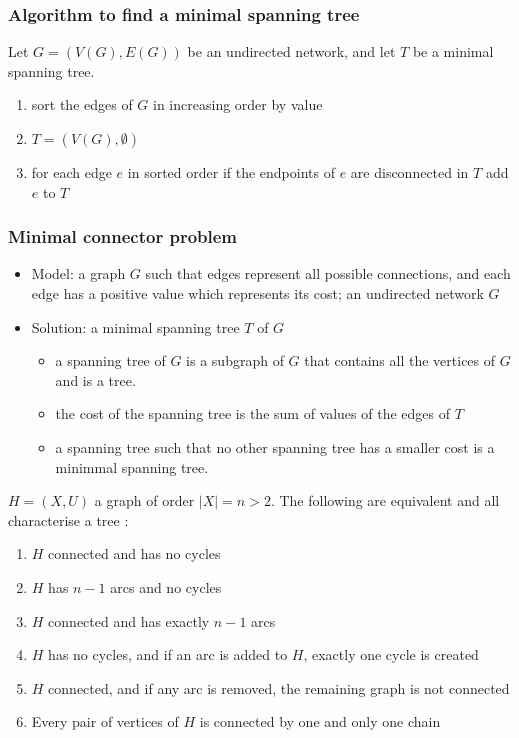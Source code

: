 \documentclass[aspectratio=169]{beamer}
\begin{document}
\begin{frame}\frametitle{Algorithm to find a minimal spanning tree}
Let $G=(V(G),E(G))$ be an undirected network, and let $T$ be a minimal spanning tree.
 
\begin{enumerate}
\item sort the edges of $G$ in increasing order by value
\item $T=(V(G),\emptyset)$
\item for each edge $e$ in sorted order
        if the endpoints of $e$ are disconnected in $T$
        add $e$ to $T$
\end{enumerate}
\end{frame}

\begin{frame}\frametitle{Minimal connector problem}
\begin{itemize}
\item Model: a graph $G$ such that edges represent all possible connections, and each edge has a positive value which represents its cost; 
an undirected network $G$
\item Solution: a  minimal spanning tree $T$ of $G$
\begin{itemize}
\item a spanning tree of $G$ is a subgraph of $G$ that contains all the vertices of $G$ and is a tree.
\item the cost of the spanning tree is the sum of values of the edges of $T$
\item a spanning tree such that no other spanning tree has a smaller cost is a minimmal spanning tree.
\end{itemize}
\end{itemize}
\end{frame}



\begin{frame}
\begin{theorem}\label{th:characterisation_tree}
$H=(X,U)$ a graph of order $|X|=n>2$. The following are equivalent and all characterise a tree :
\begin{enumerate}
\item $H$ connected and has no cycles
\item $H$ has $n-1$ arcs and no cycles
\item $H$ connected and has exactly $n-1$ arcs
\item $H$ has no cycles, and if an arc is added to $H$, exactly one cycle is created
\item $H$ connected, and if any arc is removed, the remaining graph is not
connected
\item Every pair of vertices of $H$ is connected by one and only one chain
\end{enumerate}
\end{theorem}
\end{frame}
\end{document}
